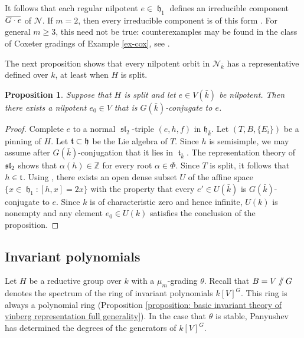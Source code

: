 \documentclass{article} %
\newtheorem{proposition}{Proposition}[section]
\numberwithin{equation}{section}
\theoremstyle{definition}
\DeclareMathOperator{\liesl}{\mathfrak{sl}}
\DeclareMathOperator{\lieh}{\mathfrak{h}}
\DeclareMathOperator{\liet}{\mathfrak{t}}
\newcommand{\GIT}{\mathbin{/\mkern-6mu/}}
\newcommand{\Z}{\mathbb{Z}}
\newcommand{\overbar}[1]{\mkern 1.5mu\overline{\mkern-1.5mu#1\mkern-1.5mu}\mkern 1.5mu}
\newcommand{\frakh}{\mathfrak h}
\begin{document}
It follows that each regular nilpotent $e\in \lieh_1$ defines an irreducible component $\overbar{G\cdot e}$ of $\mathcal{N}$. 
If $m=2$, then every irreducible component is of this form \cite[Theorem 6]{KostantRallis-Orbitsrepresentationssymmetrisspaces}. For general $m\geq 3$, this need not be true: counterexamples may be found in the class of Coxeter gradings of Example \ref{ex-cox}, see \cite[Example 4.4]{Panyushev-Invarianttheorythetagroups}.




The next proposition shows that every nilpotent orbit in $\mathcal{N}_{\bar{k}}$ has a representative defined over $k$, at least when $H$ is split.

\begin{proposition}\label{proposition: nilpotents on split groups descend}
    Suppose that $H$ is split and let $e\in V(\bar{k})$ be nilpotent. 
    Then there exists a nilpotent $e_0 \in V$ that is $G(\bar{k})$-conjugate to $e$.
\end{proposition}
\begin{proof}
    Complete $e$ to a normal $\liesl_2$-triple $(e,h,f)$ in $\frakh_{\bar{k}}$.
    Let $(T,B,\{E_i\})$ be a pinning of $H$. 
    Let $\frak{t}\subset \frak{h}$ be the Lie algebra of $T$.
    Since $h$ is semisimple, we may assume after $G(\bar{k})$-conjugation that it lies in $\liet_{\bar{k}}$.
    The representation theory of $\frak{sl}_2$ shows that  $\alpha(h) \in \Z$ for every root $\alpha\in \Phi$.
    Since $T$ is split, it follows that $h \in \frak{t}$. 
    Using \cite[Proposition 10]{deGraaf-nilporbitsthetagroups}, there exists an open dense subset $U$ of the affine space $\{x\in \lieh_1\colon [h,x] = 2x \}$ with the property that every $e' \in U(\bar{k})$ is $G(\bar{k})$-conjugate to $e$.
    Since $k$ is of characteristic zero and hence infinite, $U(k)$ is nonempty and any element $e_0\in U(k)$ satisfies the conclusion of the proposition.
\end{proof}


\subsection{Invariant polynomials}\label{subsec: invariant polynomials}

Let $H$ be a reductive group over $k$ with a $\mu_m$-grading $\theta$.
Recall that $B = V\GIT G$ denotes the spectrum of the ring of invariant polynomials $k[V]^G$.
This ring is always a polynomial ring (Proposition \ref{proposition: basic invariant theory of vinberg representation full generality}).
In the case that $\theta$ is stable, Panyushev has determined the degrees of the generators of $k[V]^G$.
\end{document}
